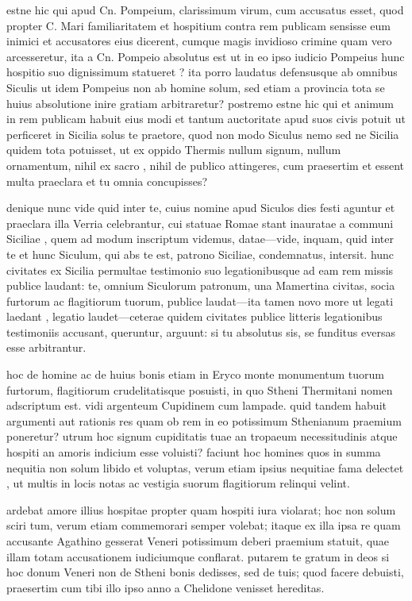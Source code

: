  estne hic qui apud Cn. Pompeium, clarissimum virum, cum accusatus esset, quod propter C. Mari familiaritatem et hospitium contra rem publicam sensisse eum inimici et accusatores eius dicerent, cumque magis invidioso crimine quam vero arcesseretur, ita a Cn. Pompeio absolutus est ut in eo ipso iudicio Pompeius hunc hospitio suo dignissimum statueret ? ita porro laudatus defensusque ab omnibus Siculis ut idem Pompeius non ab homine solum, sed etiam a provincia tota se huius absolutione inire gratiam arbitraretur? postremo estne hic qui et animum in rem publicam habuit eius modi et tantum auctoritate apud suos civis potuit ut perficeret in Sicilia solus te praetore, quod non modo Siculus nemo sed ne Sicilia quidem tota potuisset, ut ex oppido Thermis nullum signum, nullum ornamentum, nihil ex sacro , nihil de publico attingeres, cum praesertim et essent multa praeclara et tu omnia concupisses?

 denique nunc vide quid inter te, cuius nomine apud Siculos dies festi aguntur et praeclara illa Verria celebrantur, cui statuae Romae stant inauratae a communi Siciliae , quem ad modum inscriptum videmus, datae—vide, inquam, quid inter te et hunc Siculum, qui abs te est, patrono Siciliae, condemnatus, intersit. hunc civitates ex Sicilia permultae testimonio suo legationibusque ad eam rem missis publice laudant: te, omnium Siculorum patronum, una Mamertina civitas, socia furtorum ac flagitiorum tuorum, publice laudat—ita tamen novo more ut legati laedant , legatio laudet—ceterae quidem civitates publice litteris legationibus testimoniis accusant, queruntur, arguunt: si tu absolutus sis, se funditus eversas esse arbitrantur.

 hoc de homine ac de huius bonis etiam in Eryco monte monumentum tuorum furtorum, flagitiorum crudelitatisque posuisti, in quo Stheni Thermitani nomen adscriptum est. vidi argenteum Cupidinem cum lampade. quid tandem habuit argumenti aut rationis res quam ob rem in eo potissimum Sthenianum praemium poneretur? utrum hoc signum cupiditatis tuae an tropaeum necessitudinis atque hospiti an amoris indicium esse voluisti? faciunt hoc homines quos in summa nequitia non solum libido et voluptas, verum etiam ipsius nequitiae fama delectet , ut multis in locis notas ac vestigia suorum flagitiorum relinqui velint.

 ardebat amore illius hospitae propter quam hospiti iura violarat; hoc non solum sciri tum, verum etiam commemorari semper volebat; itaque ex illa ipsa re quam accusante Agathino gesserat Veneri potissimum deberi praemium statuit, quae illam totam accusationem iudiciumque conflarat. putarem te gratum in deos si hoc donum Veneri non de Stheni bonis dedisses, sed de tuis; quod facere debuisti, praesertim cum tibi illo ipso anno a Chelidone venisset hereditas.

